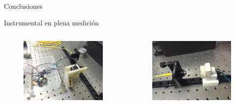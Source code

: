 \begin{frame}{Conclusiones}
    
    Instrumental en plena medición
    \begin{columns}
        \begin{column}{0.5\textwidth}
            
            \begin{figure}[H]
                \centering
                \includegraphics[width=\textwidth]{fig/perfilador/setup_foto}
            \end{figure}
        \end{column}
        
        \begin{column}{0.5\textwidth}
            \begin{figure}[H]
                \centering
                \includegraphics[width=\textwidth]{fig/polarimetro/setup_foto}
            \end{figure}
        \end{column}
    \end{columns}
    

\end{frame}

